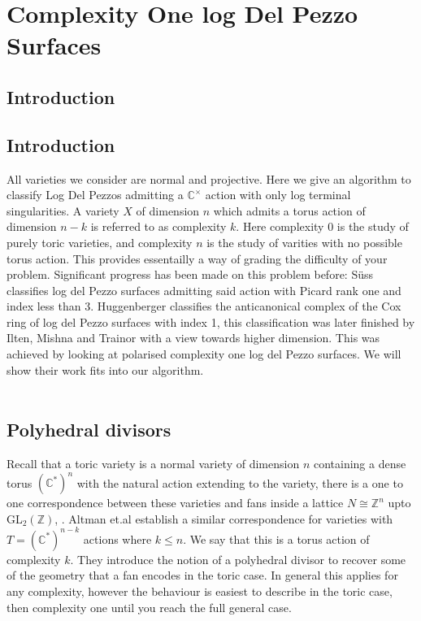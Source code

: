 \documentclass[12pt,a4paper]{book}      %
\newcommand{\C}[1]{(\mathbb{C}^*)^#1}
\begin{document}
\chapter{Complexity One log Del Pezzo Surfaces}


\section{Introduction}

\section{Introduction}

All varieties we consider are normal and projective. Here we give an algorithm to classify Log Del Pezzos admitting a $\mathbb{C}^\times$ action with only log terminal singularities. A variety $X$ of dimension $n$ which admits a torus action of dimension $n-k$ is referred to as complexity $k$. Here complexity 0 is the study of purely toric varieties, and complexity $n$ is the study of varities with no possible torus action. This provides essentailly a way of grading the difficulty of your problem. Significant progress has been made on this problem before: S\"{u}ss \cite{Suss} classifies log del Pezzo surfaces admitting said action with Picard rank one and index less than 3. Huggenberger \cite{Huggenberger} classifies the anticanonical complex of the Cox ring of log del Pezzo surfaces with index 1, this classification was later finished by Ilten, Mishna and Trainor \cite{IMT} with a view towards higher dimension. This was achieved by looking at polarised complexity one log del Pezzo surfaces. We will show their work fits into our algorithm. 
\\
\\
\section{Polyhedral divisors}
Recall that a toric variety is a  normal variety of dimension $n$ containing a dense torus $\C{n}$ with the natural action extending to the variety, there is a one to one correspondence between these varieties and fans inside a lattice $N \cong \mathbb{Z}^n$ upto GL$_2(\mathbb{Z})$, \cite{Cox}.
Altman et.al \cite{Altmann} establish a similar correspondence for varieties with $T = \C{{ n-k}}$ actions where $k \leq n$. We say that this is a torus action of complexity $k$. They introduce the notion of a polyhedral divisor to recover some of the geometry that a fan encodes in the toric case. In general this applies for any complexity, however the behaviour is easiest to describe in the toric case, then complexity one until you reach the full general case.
\end{document}
